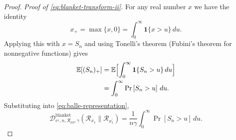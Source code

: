 \documentclass{article}
\theoremstyle{plain}
\theoremstyle{definition}
\begin{document}
\begin{proof}
\smallskip
\noindent\emph{Proof of \eqref{eq:blanket-transform-ii}.}
For any real number $x$ we have the identity
\[
  x_+ = \max\{x,0\}
      = \int_0^\infty \mathbf 1\{x>u\}\,du.
\]
Applying this with $x = S_n$ and using Tonelli's theorem (Fubini's theorem
for nonnegative functions) gives
\[
\begin{aligned}
  \mathbb E[(S_n)_+]
  &= \mathbb E\Bigl[\int_0^\infty \mathbf 1\{S_n>u\}\,du\Bigr] \\
  &= \int_0^\infty \Pr\left[S_n>u\right]\,du.
\end{aligned}
\]
Substituting into \eqref{eq:balle-representation},
\begin{equation}
  \label{eq:D-blanket-tail-Sn}
  \mathcal D^{\mathrm{blanket}}_{e^{\varepsilon},n,\mathcal R_{\mathrm{ref}},\gamma}(
    \mathcal{R}_{x_1} \| \mathcal{R}_{x_1^\prime})
  = \frac{1}{n\gamma}
    \int_0^\infty
      \Pr\left[S_n>u\right]\,du.
\end{equation}


\end{proof}
\end{document}
